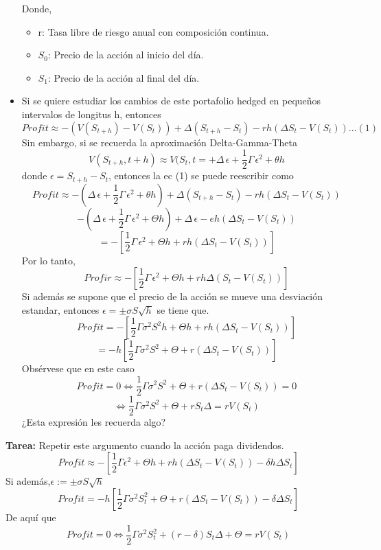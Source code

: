 \documentclass[12pts]{extarticle}
\begin{document}
\begin{itemize}
\begin{enumerate}
\end{enumerate}
Donde, 
\begin{itemize}
\item r: Tasa libre de riesgo anual con composición continua.
\item $S_0$: Precio de la acción al inicio del día. 
\item $S_1$: Precio de la acción al final del día. 
\end{itemize}
\item Si se quiere estudiar los cambios de este portafolio hedged en pequeños intervalos de longitus h, entonces
$$Profit \approx -(V(S_{t+h})-V(S_t))+ \Delta(S_{t+h}-S_t)-rh(\Delta S_t-V(S_t))...(1)$$
Sin embargo, si se recuerda la aproximación Delta-Gamma-Theta
$$V(S_{t+h}, t+h)\approx V(S_t, t= +\Delta \, \epsilon + \frac{1}{2}\Gamma \, \epsilon^2 +\theta h$$
donde $\epsilon=S_{t+h}-S_t$, entonces la ec (1) se puede reescribir como
$$Profit \approx -(\Delta \, \epsilon +\frac{1}{2}\Gamma \, \epsilon^2 +\theta h)+\Delta(S_{t+h}-S_t)-rh(\Delta S_t-V(S_t))$$
$$-(\Delta \, \epsilon +\frac{1}{2}\Gamma \, \epsilon^2 +\Theta h)+\Delta \, \epsilon -eh(\Delta S_t-V(S_t))$$
$$=-[\frac{1}{2}\Gamma \, \epsilon^2+\Theta h +rh(\Delta S_t-V(S_t))]$$
Por lo tanto,
$$Profir \approx -[\frac{1}{2}\Gamma \, \epsilon^2+\Theta h+ rh\Delta (S_t-V(S_t))]$$
Si además se supone que el precio de la acción se mueve una desviación estandar, entonces $\epsilon=\pm \sigma S \sqrt{h}$ se tiene que.
$$Profit = -[\frac{1}{2}\Gamma \sigma^2 S^2 h+\Theta h +rh(\Delta S_t-V(S_t))]$$
$$=-h[\frac{1}{2}\Gamma \sigma^2 S^2 +\Theta  +r(\Delta S_t-V(S_t))]$$
Obsérvese que en este caso
$$Profit =0 \Leftrightarrow \frac{1}{2}\Gamma \sigma^2 S^2 +\Theta  +r(\Delta S_t-V(S_t))=0$$
$$ \Leftrightarrow \frac{1}{2}\Gamma \sigma^2 S^2 +\Theta + rS_t\Delta=rV(S_t)$$
¿Esta expresión les recuerda algo? 
\end{itemize}
\textbf{Tarea:} Repetir este argumento cuando la acción paga dividendos. 
$$Profit \approx  -[\frac{1}{2}\Gamma \epsilon^2 +\Theta h +rh(\Delta S_t-V(S_t))-\delta h \Delta S_t]$$
Si además,$\epsilon := \pm \sigma S\sqrt{h}$
$$Profit=-h [\frac{1}{2}\Gamma \sigma^2 S_t^2 +\Theta  +r(\Delta S_t-V(S_t))-\delta \Delta S_t]$$
De aquí que 
$$Profit=0 \Leftrightarrow \frac{1}{2}\Gamma \sigma^2 S_t^2  +(r-\delta)S_t\Delta+\Theta=rV(S_t)$$
\end{document}
